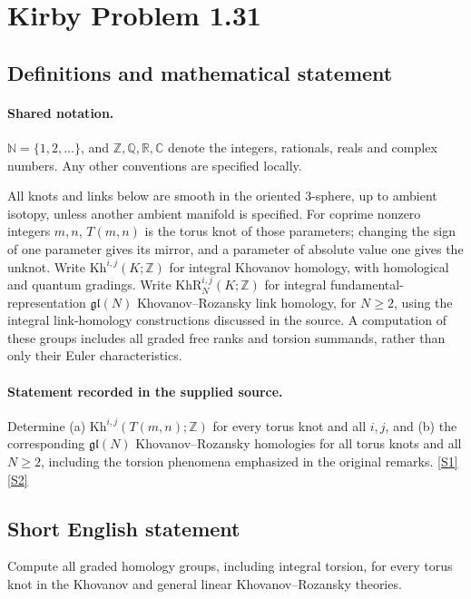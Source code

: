 \documentclass[11pt]{article}
\newcommand{\sref}[2]{\hyperlink{source:#1:#2}{[S#2]}}
\begin{document}
\section{Kirby Problem 1.31}\label{statement}

\subsection{Definitions and mathematical statement}

\paragraph{Shared notation.}$\mathbb N=\{1,2,\ldots\}$, and $\mathbb Z,\mathbb Q,\mathbb R,\mathbb C$ denote the integers, rationals, reals and complex numbers. Any other conventions are specified locally.


All knots and links below are smooth in the oriented $3$-sphere, up to ambient isotopy, unless another ambient manifold is specified. For coprime nonzero integers $m,n$, $T(m,n)$ is the torus knot of those parameters; changing the sign of one parameter gives its mirror, and a parameter of absolute value one gives the unknot. Write $\mathrm{Kh}^{i,j}(K;\mathbb Z)$ for integral Khovanov homology, with homological and quantum gradings. Write $\mathrm{KhR}_{N}^{i,j}(K;\mathbb Z)$ for integral fundamental-representation $\mathfrak{gl}(N)$ Khovanov--Rozansky link homology, for $N\geq2$, using the integral link-homology constructions discussed in the source. A computation of these groups includes all graded free ranks and torsion summands, rather than only their Euler characteristics.
\paragraph{Statement recorded in the supplied source.}
Determine (a) $\mathrm{Kh}^{i,j}(T(m,n);\mathbb Z)$ for every torus knot and all $i,j$, and (b) the corresponding $\mathfrak{gl}(N)$ Khovanov--Rozansky homologies for all torus knots and all $N\geq2$, including the torsion phenomena emphasized in the original remarks. \sref{statement}{1}\sref{statement}{2}
\subsection{Short English statement}
Compute all graded homology groups, including integral torsion, for every torus knot in the Khovanov and general linear Khovanov--Rozansky theories.
\end{document}
